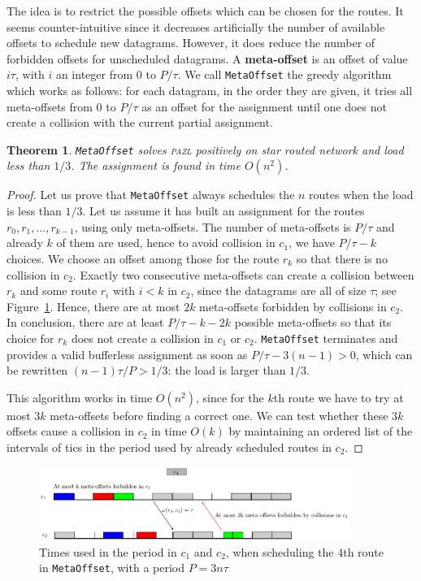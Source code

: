 \documentclass[a4paper,10pt]{journal}
\newcommand\metaoffset{\texttt{MetaOffset}\xspace}
\newtheorem{theorem}{Theorem}
\newcommand\pazl{\textsc{pazl}\xspace}
\begin{document}
The idea is to restrict the possible offsets which can be chosen for the routes. It seems counter-intuitive since it decreases artificially the number of available offsets to schedule new datagrams. However, it does reduce the number of forbidden offsets for unscheduled datagrams. A \textbf{meta-offset} is an offset of value $i\tau$, with $i$ an integer from $0$ to $P / \tau$. We call \metaoffset the greedy algorithm which works as follows: for each datagram, in the order they are given, it tries all meta-offsets from $0$ to $P/\tau$ as an offset for the assignment until one does not create a collision with the current partial assignment.

    \begin{theorem}
    \metaoffset solves \pazl positively on star routed network and load less than $1/3$. 
    The assignment is found in time $O(n^2)$.
    \end{theorem}
    \begin{proof}
    Let us prove that \metaoffset always schedules the $n$ routes when the load is less than $1/3$. Let us assume it has built an assignment for the routes $r_0,r_1,\ldots,r_{k-1}$, using only meta-offsets. The number of meta-offsets is $P/\tau$ and already $k$ of them are used, hence to avoid collision in $c_1$, we have $P/\tau - k$ choices. We choose an offset among those for the route $r_k$ so that there is no collision in $c_2$. Exactly two consecutive meta-offsets can create a collision between $r_k$ and some route $r_i$ with $i < k$ in $c_2$, since the datagrams are all of size $\tau$; see Figure~\ref{fig:metaoffset}. Hence, there are at most $2k$ meta-offsets forbidden by collisions in $c_2$. In conclusion, there are at least $P/\tau - k - 2k$ possible meta-offsets so that its choice for $r_k$ does not create a collision in $c_1$ or $c_2$.  \metaoffset terminates and provides a valid bufferless assignment as soon as $P/\tau - 3(n-1) > 0$, which can be rewritten $(n-1)\tau /P > 1/3$: the load is larger than $1/3$.

     This algorithm works in time $O(n^2)$, since for the $k$th route we have to try at most $3k$ meta-offsets before finding a correct one. We can test whether these $3k$ offsets cause a collision in $c_2$ in time $O(k)$ by maintaining an ordered list of the intervals of tics in the period used by already scheduled routes in $c_2$.
     \end{proof}
         
     \begin{figure}
      \begin{center}
      \includegraphics[width=0.9\textwidth]{ex3nt.pdf}
      \end{center}
      \caption{Times used in the period in $c_1$ and $c_2$, when scheduling the $4$th route in \metaoffset, with a period $P = 3n\tau$}
      \label{fig:metaoffset}
      \end{figure}					
	
\end{document}
